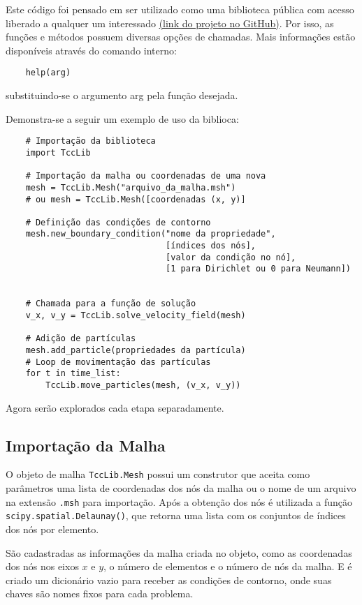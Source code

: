 Este código foi pensado em ser utilizado como uma biblioteca pública com acesso liberado a qualquer um interessado \href{https://github.com/encarvlucas/LucasCarvalhoTCC}{(link do projeto no GitHub)}.
Por isso, as funções e métodos possuem diversas opções de chamadas.
Mais informações estão disponíveis através do comando interno: \begin{verbatim}
    help(arg)
\end{verbatim}
substituindo-se o argumento arg pela função desejada.

Demonstra-se a seguir um exemplo de uso da biblioca:
\begin{verbatim}
    # Importação da biblioteca
    import TccLib

    # Importação da malha ou coordenadas de uma nova
    mesh = TccLib.Mesh("arquivo_da_malha.msh")
    # ou mesh = TccLib.Mesh([coordenadas (x, y)]

    # Definição das condições de contorno
    mesh.new_boundary_condition("nome da propriedade",
                                [índices dos nós], 
                                [valor da condição no nó],
                                [1 para Dirichlet ou 0 para Neumann])


    # Chamada para a função de solução
    v_x, v_y = TccLib.solve_velocity_field(mesh)

    # Adição de partículas
    mesh.add_particle(propriedades da partícula)
    # Loop de movimentação das partículas
    for t in time_list:
        TccLib.move_particles(mesh, (v_x, v_y))
\end{verbatim}

Agora serão explorados cada etapa separadamente.

\subsection{\textbf{Importação da Malha}}
O objeto de malha \verb|TccLib.Mesh| possui um construtor que aceita como parâmetros uma lista de coordenadas dos nós da malha ou o nome de um arquivo na extensão \verb|.msh| para importação.
Após a obtenção dos nós é utilizada a função \verb|scipy.spatial.Delaunay()|, que retorna uma lista com os conjuntos de índices dos nós por elemento.

São cadastradas as informações da malha criada no objeto, como as coordenadas dos nós nos eixos $x$ e $y$, o número de elementos e o número de nós da malha.
E é criado um dicionário vazio para receber as condições de contorno, onde suas chaves são nomes fixos para cada problema.

